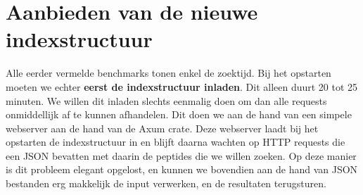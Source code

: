 \section{Aanbieden van de nieuwe indexstructuur}\label{sec:aanbieden-van-de-nieuwe-indexstructuur}
Alle eerder vermelde benchmarks tonen enkel de zoektijd.
Bij het opstarten moeten we echter \textbf{eerst de indexstructuur inladen}.
Dit alleen duurt 20 tot 25 minuten.
We willen dit inladen slechts eenmalig doen om dan alle requests onmiddellijk af te kunnen afhandelen.
Dit doen we aan de hand van een simpele webserver aan de hand van de Axum crate\cite{axum}.
Deze webserver laadt bij het opstarten de indexstructuur in en blijft daarna wachten op HTTP requests die een JSON bevatten met daarin de peptides die we willen zoeken.
Op deze manier is dit probleem elegant opgelost, en kunnen we bovendien aan de hand van JSON bestanden erg makkelijk de input verwerken, en de resultaten terugsturen.


